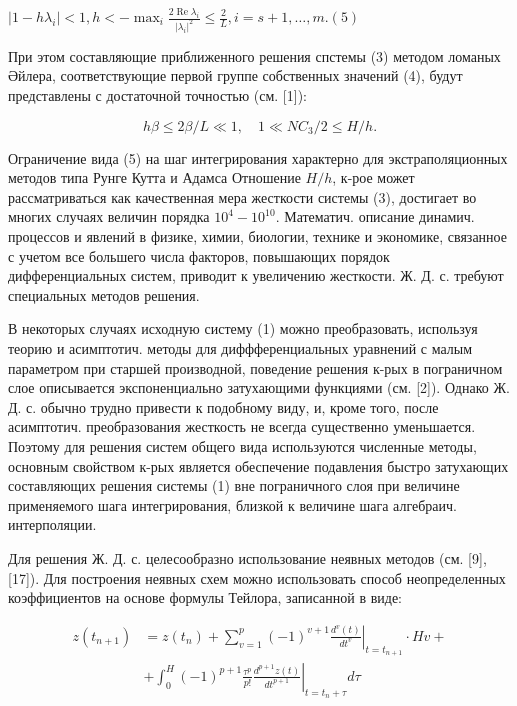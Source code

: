 \documentclass[10pt]{article}
\begin{document}
$\left|1-h \lambda_{i}\right|<1, h<-\max _{i} \frac{2 \operatorname{Re} \lambda_{i}}{\left|\lambda_{i}\right|^{2}} \leqslant \frac{2}{L}, i=s+1, \ldots, m .(5)$



При этом составляющие приближенного решения спстемы (3) методом ломаных Әйлера, соответствующие первой группе собственных значений (4), будут представлены с достаточной точностью (см. [1]):



\[

h \beta \leqslant 2 \beta / L \ll 1, \quad 1 \ll N C_{3} / 2 \leqslant H / h .

\]



Ограничение вида (5) на шаг интегрирования характерно для экстраполяционных методов типа Рунге Кутта и Адамса Отношение $H / h$, к-рое может рассматриваться как качественная мера жесткости системы (3), достигает во многих случаях величин порядка $10^{4}-10^{10}$. Математич. описание динамич. процессов и явлений в физике, химии, биологии, технике и экономике, связанное с учетом все большего числа факторов, повышающих порядок дифференциальных систем, приводит к увеличению жесткости. Ж. Д. с. требуют специальных методов решения.



В некоторых случаях исходную систему (1) можно преобразовать, используя теорию и асимптотич. методы для диффференциальных уравнений с малым параметром при старшей производной, поведение решения к-рых в пограничном слое описывается экспоненциально затухающими функциями (см. [2]). Однако Ж. Д. с. обычно трудно привести к подобному виду, и, кроме того, после асимптотич. преобразования жесткость не всегда существенно уменьшается. Поэтому для решения систем общего вида используются численные методы, основным свойством к-рых является обеспечение подавления быстро затухающих составляющих решения системы (1) вне пограничного слоя при величине применяемого шага интегрирования, близкой к величине шага алгебраич. интерполяции.



Для решения Ж. Д. с. целесообразно использование неявных методов (см. [9], [17]). Для построения неявных схем можно использовать способ неопределенных коэффициентов на основе формулы Тейлора, записанной в виде:



\[

\begin{aligned}

z\left(t_{n+1}\right) & =z\left(t_{n}\right)+\left.\sum_{v=1}^{p}(-1)^{v+1} \frac{d^{v}(t)}{d t^{v}}\right|_{t=t_{n+1}} \cdot H v+ \\

& +\left.\int_{0}^{H}(-1)^{p+1} \frac{\tau^{p}}{p !} \frac{d^{p+1} z(t)}{d t^{p+1}}\right|_{t=t_{n}+\tau} d \tau

\end{aligned}

\]
\end{document}
